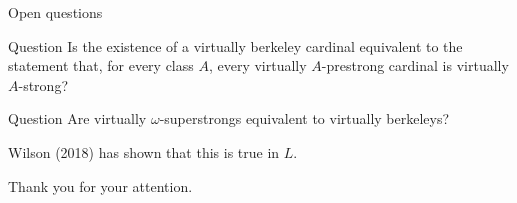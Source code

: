 \begin{frame}{Open questions}
  \begin{block}{Question}
    Is the existence of a virtually berkeley cardinal equivalent to the statement that, for every class $A$, every virtually $A$-prestrong cardinal is virtually $A$-strong?
  \end{block}

  \pause

  \begin{block}{Question}
    Are virtually $\omega$-superstrongs equivalent to virtually berkeleys?

    Wilson (2018) has shown that this is true in $L$.
  \end{block}
\end{frame}

{
\begin{frame}
  \phantom{hidden text}
  \begin{center}
    {\LARGE Thank you for your attention.}
  \end{center}

\end{frame}}


